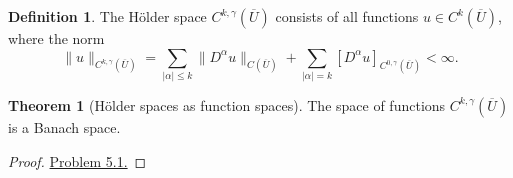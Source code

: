 \documentclass[11pt]{article}
\theoremstyle{definition}
\newtheorem*{theorem}{Theorem}
\newtheorem*{definition}{Definition}
\begin{document}
\begin{definition}
The H\"{o}lder space $C^{k,\gamma}(\overline{U})$ consists of all functions $u \in C^k(\overline{U})$,
where the norm
\[\|u\|_{C^{k,\gamma}(\overline{U})} = \sum_{|\alpha| \leq k}\|D^{\alpha}u\|_{C(\overline{U})} + \sum_{|\alpha| = k}[D^{\alpha}u]_{C^{0,\gamma}(\overline{U})} < \infty.\]
\end{definition}

\begin{theorem}[H\"{o}lder spaces as function spaces]
The space of functions $C^{k,\gamma}(\overline{U})$ is a Banach space.
\end{theorem}
\begin{proof}
\href{https://github.com/Aidenwjt/some-math-notes/blob/master/exercises/evans/exercises.pdf}{Problem 5.1.}
\end{proof}

\newpage
\end{document}
